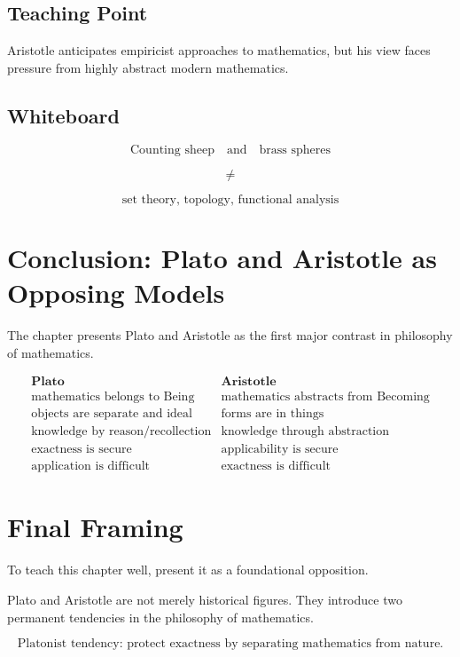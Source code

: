 \documentclass[11pt]{article}
\begin{document}
\subsection*{Teaching Point}

Aristotle anticipates empiricist approaches to mathematics, but his view faces pressure
from highly abstract modern mathematics.

\subsection*{Whiteboard}

\[
\text{Counting sheep}
\quad \text{and}
\quad
\text{brass spheres}
\]

\[
\neq
\]

\[
\text{set theory, topology, functional analysis}
\]

\section*{Conclusion: Plato and Aristotle as Opposing Models}

The chapter presents Plato and Aristotle as the first major contrast in philosophy of
mathematics.

\[
\begin{array}{c|c}
\textbf{Plato} & \textbf{Aristotle} \\
\hline
\text{mathematics belongs to Being} & \text{mathematics abstracts from Becoming} \\
\text{objects are separate and ideal} & \text{forms are in things} \\
\text{knowledge by reason/recollection} & \text{knowledge through abstraction} \\
\text{exactness is secure} & \text{applicability is secure} \\
\text{application is difficult} & \text{exactness is difficult}
\end{array}
\]

\section*{Final Framing}

To teach this chapter well, present it as a foundational opposition.

Plato and Aristotle are not merely historical figures. They introduce two permanent
tendencies in the philosophy of mathematics.

\[
\boxed{
\text{Platonist tendency: protect exactness by separating mathematics from nature.}
}
\]
\end{document}

